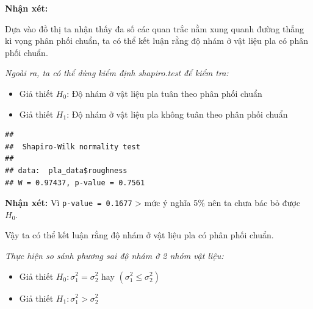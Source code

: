 \textbf{Nhận xét:}

Dựa vào đồ thị ta nhận thấy đa số các quan trắc nằm xung quanh đường
thẳng kì vọng phân phối chuẩn, ta có thể kết luận rằng độ nhám ở vật
liệu pla có phân phối chuẩn.

\emph{Ngoài ra, ta có thể dùng kiểm định shapiro.test để kiểm tra:}

\begin{itemize}
\tightlist
\item
  Giả thiết \(H_0\): Độ nhám ở vật liệu pla tuân theo phân phối chuẩn
\item
  Giả thiết \(H_1\): Độ nhám ở vật liệu pla không tuân theo phân phối chuẩn
\end{itemize}

\begin{Shaded}
\begin{Highlighting}[]
\SpecialCharTok{$}
\end{Highlighting}
\end{Shaded}

\begin{verbatim}
## 
##  Shapiro-Wilk normality test
## 
## data:  pla_data$roughness
## W = 0.97437, p-value = 0.7561
\end{verbatim}

\textbf{Nhận xét:} Vì \texttt{p-value\ =\ 0.1677} \textgreater{} mức ý
nghĩa 5\% nên ta chưa bác bỏ được \(H_0\).

Vậy ta có thể kết luận rằng độ nhám ở vật liệu pla có phân phối chuẩn.

\emph{Thực hiện so sánh phương sai độ nhám ở 2 nhóm vật liệu: }

\begin{itemize}
\item
  Giả thiết \(H_0: \sigma_1^2=  \sigma_2^2\) hay
  \((\sigma_1^2≤ \sigma_2^2)\)
\item
  Giả thiết \(H_1: \sigma_1^2> \sigma_2^2\)
\end{itemize}

\begin{Shaded}
\begin{Highlighting}[]
\SpecialCharTok{$}\SpecialCharTok{$} \NormalTok{)}
\end{Highlighting}
\end{Shaded}

